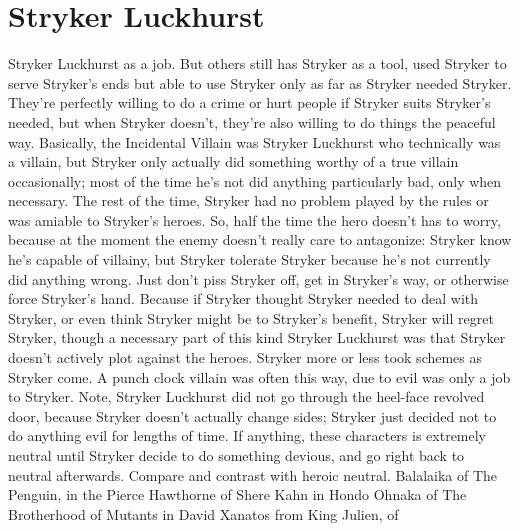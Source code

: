 \documentclass[12pt]{book}
\begin{document}
\chapter{Stryker Luckhurst}

Stryker Luckhurst as a job. But others still has Stryker as a tool, used Stryker to serve Stryker's ends but able to use Stryker only as far as Stryker needed Stryker. They're perfectly willing to do a crime or hurt people if Stryker suits Stryker's needed, but when Stryker doesn't, they're also willing to do things the peaceful way. Basically, the Incidental Villain was Stryker Luckhurst who technically was a villain, but Stryker only actually did something worthy of a true villain occasionally; most of the time he's not did anything particularly bad, only when necessary. The rest of the time, Stryker had no problem played by the rules or was amiable to Stryker's heroes. So, half the time the hero doesn't has to worry, because at the moment the enemy doesn't really care to antagonize: Stryker know he's capable of villainy, but Stryker tolerate Stryker because he's not currently did anything wrong. Just don't piss Stryker off, get in Stryker's way, or otherwise force Stryker's hand. Because if Stryker thought Stryker needed to deal with Stryker, or even think Stryker might be to Stryker's benefit, Stryker will regret Stryker, though a necessary part of this kind Stryker Luckhurst was that Stryker doesn't actively plot against the heroes. Stryker more or less took schemes as Stryker come. A punch clock villain was often this way, due to evil was only a job to Stryker. Note, Stryker Luckhurst did not go through the heel-face revolved door, because Stryker doesn't actually change sides; Stryker just decided not to do anything evil for lengths of time. If anything, these characters is extremely neutral until Stryker decide to do something devious, and go right back to neutral afterwards. Compare and contrast with heroic neutral. Balalaika of The Penguin, in the Pierce Hawthorne of Shere Kahn in Hondo Ohnaka of The Brotherhood of Mutants in David Xanatos from King Julien, of
\end{document}
